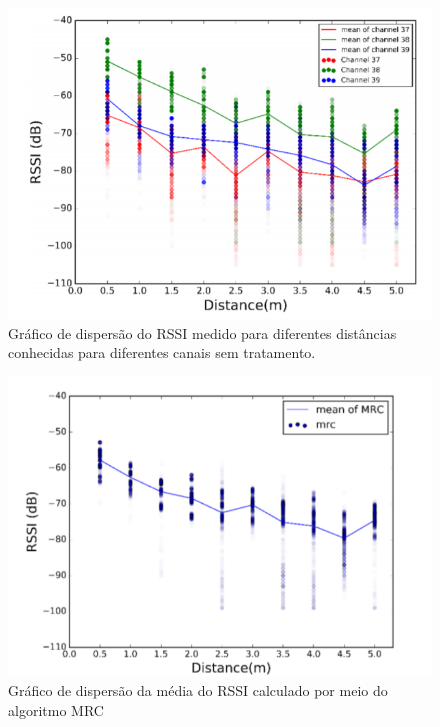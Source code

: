 \begin{figure}[H]
    \centering
    \includegraphics[scale = 1]{images/rssi_channels_raw.png}
    \caption{Gráfico de dispersão do RSSI medido para diferentes distâncias conhecidas para diferentes canais sem tratamento.  \cite{art17}}
    \label{fig:rssi_channels_raw.png}
\end{figure}

\begin{figure}[H]
    \centering
    \includegraphics[scale = 1]{images/rssi_channels_mrc.png}
    \caption{Gráfico de dispersão da média do RSSI calculado por meio do algoritmo MRC \cite{art17}}
    \label{fig:rssi_channels_mrc.png}
\end{figure}



